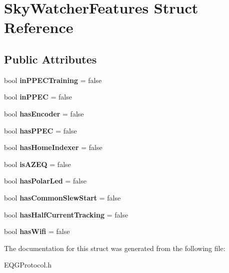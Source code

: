 \hypertarget{struct_sky_watcher_features}{}\section{Sky\+Watcher\+Features Struct Reference}
\label{struct_sky_watcher_features}
\subsection*{Public Attributes}
\begin{DoxyCompactItemize}
\item 
\mbox{\label{struct_sky_watcher_features_a447371090b5e2c4346a90e654a7f6d6a}} 
bool {\bfseries in\+P\+P\+E\+C\+Training} = false
\item 
\mbox{\label{struct_sky_watcher_features_a642b77877277ef442e7094ed455199e3}} 
bool {\bfseries in\+P\+P\+EC} = false
\item 
\mbox{\label{struct_sky_watcher_features_a78751e1cb1708965989351881ce525fe}} 
bool {\bfseries has\+Encoder} = false
\item 
\mbox{\label{struct_sky_watcher_features_abbb84e6151a8936a3fb3a2dc0100eb1b}} 
bool {\bfseries has\+P\+P\+EC} = false
\item 
\mbox{\label{struct_sky_watcher_features_a7498d63409d8ef53428e06fcd3141624}} 
bool {\bfseries has\+Home\+Indexer} = false
\item 
\mbox{\label{struct_sky_watcher_features_a75e3dc036c454da6e55e7db2aaee8176}} 
bool {\bfseries is\+A\+Z\+EQ} = false
\item 
\mbox{\label{struct_sky_watcher_features_a6f02d7a4c6af0e7c43d8cad9da3a0d45}} 
bool {\bfseries has\+Polar\+Led} = false
\item 
\mbox{\label{struct_sky_watcher_features_a9e07eb745f039b8815c88ba81234a647}} 
bool {\bfseries has\+Common\+Slew\+Start} = false
\item 
\mbox{\label{struct_sky_watcher_features_a65b43839a6ac29ae8cfa217879fff50e}} 
bool {\bfseries has\+Half\+Current\+Tracking} = false
\item 
\mbox{\label{struct_sky_watcher_features_ac9ad6e2d283ba7a6b1137e743e99e8b5}} 
bool {\bfseries has\+Wifi} = false
\end{DoxyCompactItemize}


The documentation for this struct was generated from the following file\+:\begin{DoxyCompactItemize}
\item 
E\+Q\+G\+Protocol.\+h\end{DoxyCompactItemize}
